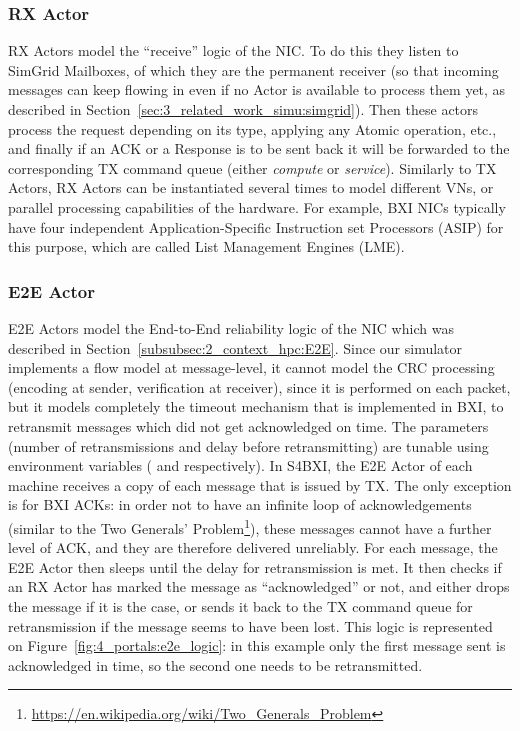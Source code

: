 \subsubsection{RX Actor}
\label{subsubsec:4_portals:RX}

RX Actors model the ``receive'' logic of the NIC. To do this they listen to
SimGrid Mailboxes, of which they are the permanent receiver (so that incoming
messages can keep flowing in even if no Actor is available to process them yet,
as described in Section~\ref{sec:3_related_work_simu:simgrid}). Then these
actors process the request depending on its type, applying any Atomic operation,
etc., and finally if an ACK or a Response is to be sent back it will be
forwarded to the corresponding TX command queue (either \textit{compute} or
\textit{service}). Similarly to TX Actors, RX Actors can be instantiated several
times to model different VNs, or parallel processing capabilities of the
hardware. For example, BXI NICs typically have four independent
Application-Specific Instruction set Processors (ASIP) for this purpose, which
are called List Management Engines (LME).

\subsubsection{E2E Actor}

E2E Actors model the End-to-End reliability logic of the NIC which was described
in Section~\ref{subsubsec:2_context_hpc:E2E}. Since our simulator implements a
flow model at message-level, it cannot model the CRC processing (encoding at
sender, verification at receiver), since it is performed on each packet, but it
models completely the timeout mechanism that is implemented in BXI, to
retransmit messages which did not get acknowledged on time. The parameters
(number of retransmissions and delay before retransmitting) are tunable using
environment variables ( and
 respectively). In S4BXI, the E2E Actor of each machine
receives a copy of each message that is issued by TX. The only exception is for
BXI ACKs: in order not to have an infinite loop of acknowledgements (similar to
the Two Generals'
Problem\footnote{\url{https://en.wikipedia.org/wiki/Two_Generals_Problem}}),
these messages cannot have a further level of ACK, and they are therefore
delivered unreliably. For each message, the E2E Actor then sleeps until the
delay for retransmission is met. It then checks if an RX Actor has marked the
message as ``acknowledged'' or not, and either drops the message if it is the
case, or sends it back to the TX command queue for retransmission if the message
seems to have been lost. This logic is represented on
Figure~\ref{fig:4_portals:e2e_logic}: in this example only the first message
sent is acknowledged in time, so the second one needs to be retransmitted.

